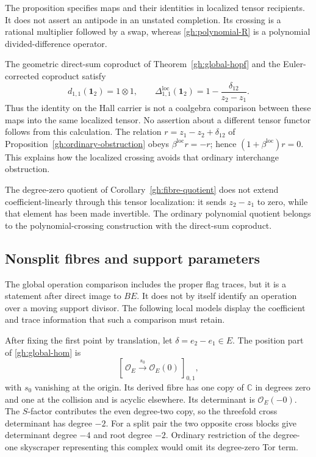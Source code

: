 The proposition specifies maps and their identities in localized
tensor recipients. It does not assert an antipode in an unstated
completion. Its crossing is a rational multiplier followed by a
swap, whereas \eqref{gh:polynomial-R} is a polynomial
divided-difference operator.

\begin{example}
\label{gh:two-coproducts}
The geometric direct-sum coproduct of
Theorem~\ref{gh:global-hopf} and the Euler-corrected coproduct
satisfy
\[
 d_{1,1}(\mathbf1_2)=1\otimes1,\qquad
 \Delta^{\mathrm{loc}}_{1,1}(\mathbf1_2)
                   =1-\frac{\delta_{12}}{z_2-z_1}.
\]
Thus the identity on the Hall carrier is not a coalgebra
comparison between these maps into the same localized tensor.
No assertion about a different tensor functor follows from this
calculation.
The relation $r=z_1-z_2+\delta_{12}$ of
Proposition~\ref{gh:ordinary-obstruction} obeys
$\beta^{\mathrm{loc}}r=-r$; hence
$(1+\beta^{\mathrm{loc}})r=0$.
This explains how the localized crossing avoids that ordinary
interchange obstruction.

The degree-zero quotient of Corollary~\ref{gh:fibre-quotient}
does not extend coefficient-linearly through this tensor
localization: it sends $z_2-z_1$ to zero, while that element has
been made invertible. The ordinary polynomial quotient belongs
to the polynomial-crossing construction with the direct-sum
coproduct.
\end{example}

\subsection{Nonsplit fibres and support parameters}

The global operation comparison includes the proper flag traces,
but it is a statement after direct image to $BE$. It does not by
itself identify an operation over a moving support divisor.
The following local models display the coefficient and trace
information that such a comparison must retain.

After fixing the first point by translation, let
$\delta=e_2-e_1\in E$. The position part of
\eqref{gh:global-hom} is
\[
 [\,\mathcal O_E\xrightarrow{s_0}\mathcal O_E(0)\,]_{0,1},
\]
with $s_0$ vanishing at the origin. Its derived fibre has one copy
of $\mathbb C$ in degrees zero and one at the collision and is
acyclic elsewhere. Its determinant is $\mathcal O_E(-0)$.
The $S$-factor contributes the even degree-two copy, so the
threefold cross determinant has degree $-2$.
For a split pair the two opposite cross blocks give determinant
degree $-4$ and root degree $-2$.
Ordinary restriction of the degree-one skyscraper representing
this complex would omit its degree-zero Tor term.

